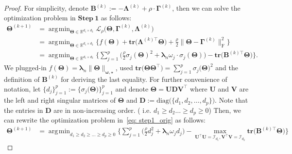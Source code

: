 \documentclass[alpha-refs]{wiley-article}
\DeclareMathOperator*{\argmin}{\arg\!\min}
\begin{document}
\begin{proof}
For simplicity, denote $\boldsymbol{B}^{(k)}:=-\boldsymbol{\Lambda}^{(k)}+\rho \cdot \boldsymbol{\Gamma}^{(k)}$, then we can solve the optimization problem in $\textbf{Step}\ \boldsymbol{1}$ as follows:
\begin{align}
    \boldsymbol{\Theta}^{(k+1)}
    &= \argmin_{\boldsymbol{\Theta}\in\mathbb{R}^{d_{1} \times d_{2}}} \mathcal{L}_{\rho} \big( \boldsymbol{\Theta},\boldsymbol{\Gamma}^{(k)},\boldsymbol{\Lambda}^{(k)} \big) \nonumber \\
    &= \argmin_{\boldsymbol{\Theta}\in\mathbb{R}^{d_{1} \times d_{2}}}  \bigg\{ f(\boldsymbol{\Theta}) + \textbf{tr}\big(\boldsymbol{\Lambda}^{(k) \top}\boldsymbol{\Theta}\big) + \frac{\rho}{2} \| \boldsymbol{\Theta}-\boldsymbol{\Gamma}^{(k)} \|_{\text{F}}^{2} \bigg\}  \nonumber \\
    &= \argmin_{\boldsymbol{\Theta}\in\mathbb{R}^{d_{1} \times d_{2}}} \bigg\{ \sum_{j=1}^{p} \bigg( \frac{\rho}{2}\sigma_{j}(\boldsymbol{\Theta})^{2} + \boldsymbol{\lambda}_{n} \omega_{j} \cdot\sigma_{j}(\boldsymbol{\Theta}) \bigg) -\textbf{tr} \big( \boldsymbol{B}^{(k) \top}\boldsymbol{\Theta} \big) \bigg\} \label{eq: step1_orig}.
\end{align}
We plugged-in $f(\boldsymbol{\Theta})=\boldsymbol{\lambda}_{n}\|\boldsymbol{\Theta}\|_{\boldsymbol{\omega,\star}}$,
used $\textbf{tr}\big(\boldsymbol{\Theta}\boldsymbol{\Theta}^{\top}\big)=\sum_{j=1}^{p}\sigma_{j}\big(\boldsymbol{\Theta}\big)^{2}$ and the definition of $\boldsymbol{B}^{(k)}$ for deriving the last equality.
For further convenience of notation, let $\{d_{j}\}_{j=1}^{p}:=\{\sigma_{j}\big(\boldsymbol{\Theta}\big)\}_{j=1}^{p}$ and
denote $\boldsymbol{\Theta}=\boldsymbol{UDV^{\top}}$ where
$\boldsymbol{U}$ and $\boldsymbol{V}$ are the left and right singular matrices of $\boldsymbol{\Theta}$ and $\boldsymbol{D}:=\text{diag}\big(\{d_{1},d_{2},\dots,d_{p}\}\big)$.
Note that the entries in $\boldsymbol{D}$ are in non-increasing order. ( i.e. $d_{1} \geq d_{2} \dots \geq d_{p} \geq 0$)
Then, we can rewrite the optimization problem in~\eqref{eq: step1_orig} as follows:
\begin{align}
    \boldsymbol{\Theta}^{(k+1)}
    &= \argmin_{d_{1}\geq d_{2}\geq \dots \geq d_{p} \geq 0 }\bigg\{ \sum_{j=1}^{p} \bigg( \frac{\rho}{2} d_{j}^{2} + \boldsymbol{\lambda}_{n}\omega_{j}d_{j} \bigg) - \max_{\boldsymbol{U}^{\top}\boldsymbol{U} = \mathcal{I}_{d_{1}}, \boldsymbol{V}^{\top}\boldsymbol{V} = \mathcal{I}_{d_{2}}} \textbf{tr}\big(\boldsymbol{B}^{(k)\top}\boldsymbol{\Theta}\big) \bigg\} \label{eq: step1_sec}

\end{align}
\end{proof}
\end{document}
